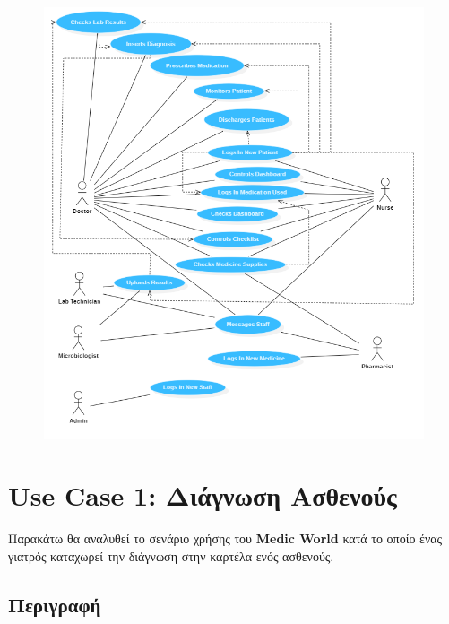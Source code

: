 \documentclass{article}
\begin{document}
\begin{figure}[!htb]
        \centering
        \includegraphics[width=1.0\textwidth]{UML.png}
        \end{figure}
        
        \vspace{0.5cm}

\section{Use Case 1: Διάγνωση Ασθενούς}

Παρακάτω θα αναλυθεί το σενάριο χρήσης του \textbf{Medic World} κατά το οποίο ένας γιατρός καταχωρεί την διάγνωση στην καρτέλα ενός ασθενούς.

\subsection{Περιγραφή}
\end{document}
